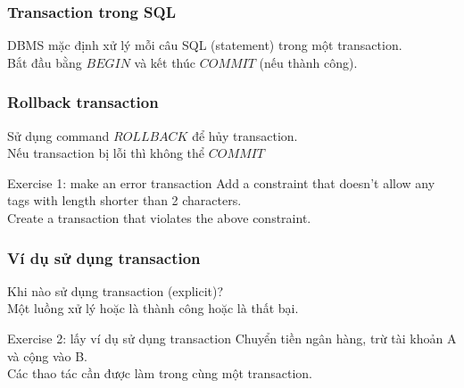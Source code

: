 \documentclass[xcolor={table, dvipsnames}]{beamer}
\begin{document}
\begin{frame}
\frametitle{Transaction trong SQL}
DBMS mặc định xử lý mỗi câu SQL (statement) trong một transaction.\\
Bắt đầu bằng $BEGIN$ và kết thúc $COMMIT$ (nếu thành công).\\
\end{frame}

\begin{frame}
\frametitle{Rollback transaction}
Sử dụng command $ROLLBACK$ để hủy transaction.\\
\pause
Nếu transaction bị lỗi thì không thể $COMMIT$\\
\pause
\begin{block}{Exercise 1: make an error transaction}
Add a constraint that doesn't allow any tags with length shorter than 2 characters.\\
Create a transaction that violates the above constraint.
\end{block}
\end{frame}

\begin{frame}
\frametitle{Ví dụ sử dụng transaction}
Khi nào sử dụng transaction (explicit)?\\
\pause
Một luồng xử lý hoặc là thành công hoặc là thất bại.\\
\pause
\begin{block}{Exercise 2: lấy ví dụ sử dụng transaction}
Chuyển tiền ngân hàng, trừ tài khoản A và cộng vào B.\\
Các thao tác cần được làm trong cùng một transaction.\\
\end{block} 
\end{frame}
\end{document}
